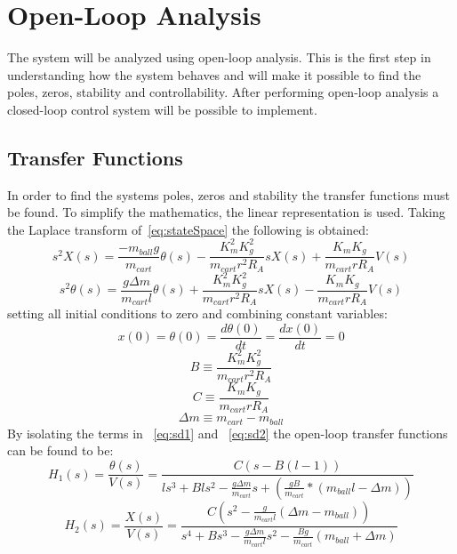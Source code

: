 \documentclass[12pt]{article} %
\begin{document}
\section{Open-Loop Analysis}
The system will be analyzed using open-loop analysis. This is the first step in understanding how the system behaves and will make it possible to find the poles, zeros, stability and controllability. After performing open-loop analysis a closed-loop control system will be possible to implement.  
\subsection{Transfer Functions}
In order to find the systems poles, zeros and stability the transfer functions must be found. To simplify the mathematics, the linear representation is used. Taking the Laplace transform of~\ref{eq:stateSpace} the following is obtained:
\begin{equation} \label{eq:sd1}
s^2 X(s) = \frac{-m_{ball}g}{m_{cart}}\theta(s) - \frac{K_m^2K_g^2}{m_{cart}r^2R_A}s X(s) + \frac{K_mK_g}{m_{cart}rR_A}V(s)
\end{equation}
\begin{equation} \label{eq:sd2}
s^2 \theta(s) = \frac{g \Delta m}{m_{cart}l}\theta(s) + \frac{K_m^2K_g^2}{m_{cart}r^2R_A}s X(s) - \frac{K_mK_g}{m_{cart}rR_A}V(s)
\end{equation}
setting all initial conditions to zero and combining constant variables:
\begin{equation}
x(0) = \theta(0) = \frac{d\theta(0)}{dt} = \frac{dx(0)}{dt} = 0
\end{equation}
\begin{equation}
B \equiv \frac{K_m^2K_g^2}{m_{cart}r^2R_A}
\end{equation}
\begin{equation}
C \equiv \frac{K_mK_g}{m_{cart}rR_A}
\end{equation}
\begin{equation}
\Delta m \equiv m_{cart} - m_{ball}
\end{equation}
By isolating the terms in ~\ref{eq:sd1} and ~\ref{eq:sd2} the open-loop transfer functions can be found to be:
\begin{equation} \label{eq:tf1}
H_1(s) = \frac{\theta(s)}{V(s)} = \frac{C(s - B(l-1))}{ls^3 + Bls^2 - \frac{g \Delta m}{m_{cart}}s + (\frac{gB}{m_{cart}}*(m_{ball}l - \Delta m))}
\end{equation}
\begin{equation} \label{eq:tf2}
H_2(s) = \frac{X(s)}{V(s)} = \frac{C(s^2 - \frac{g}{m_{cart}l}(\Delta m - m_{ball}))}{s^4 + Bs^3 - \frac{g \Delta m }{m_{cart}l}s^2 - \frac{Bg}{m_{cart}}(m_{ball} + \Delta m)}
\end{equation}
\end{document}
